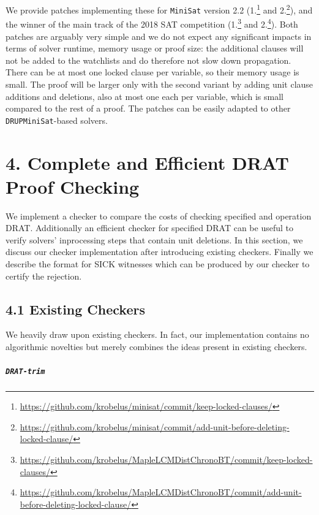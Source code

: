 \documentclass[
]{report}
\begin{document}
We provide patches implementing these for \texttt{MiniSat} version 2.2
(1.\footnote{\url{https://github.com/krobelus/minisat/commit/keep-locked-clauses/}}
and 2.\footnote{\url{https://github.com/krobelus/minisat/commit/add-unit-before-deleting-locked-clause/}}),
and the winner of the main track of the 2018 SAT competition
(1.\footnote{\url{https://github.com/krobelus/MapleLCMDistChronoBT/commit/keep-locked-clauses/}}
and 2.\footnote{\url{https://github.com/krobelus/MapleLCMDistChronoBT/commit/add-unit-before-deleting-locked-clause/}}).
Both patches are arguably very simple and we do not expect any
significant impacts in terms of solver runtime, memory usage or proof
size: the additional clauses will not be added to the watchlists and do
therefore not slow down propagation. There can be at most one locked
clause per variable, so their memory usage is small. The proof will be
larger only with the second variant by adding unit clause additions and
deletions, also at most one each per variable, which is small compared
to the rest of a proof. The patches can be easily adapted to other
\texttt{DRUPMiniSat}-based solvers.

\hypertarget{complete-and-efficient-drat-proof-checking}{%
\chapter{4. Complete and Efficient DRAT Proof
Checking}\label{complete-and-efficient-drat-proof-checking}}

We implement a checker to compare the costs of checking specified and
operation DRAT. Additionally an efficient checker for specified DRAT can
be useful to verify solvers' inprocessing steps that contain unit
deletions. In this section, we discuss our checker implementation after
introducing existing checkers. Finally we describe the format for SICK
witnesses which can be produced by our checker to certify the rejection.

\hypertarget{existing-checkers}{%
\section{4.1 Existing Checkers}\label{existing-checkers}}

We heavily draw upon existing checkers. In fact, our implementation
contains no algorithmic novelties but merely combines the ideas present
in existing checkers.

\paragraph{\texttt{DRAT-trim}}
\end{document}
